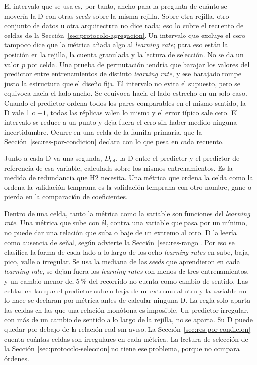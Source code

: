 El intervalo que se usa es, por tanto, ancho para la pregunta de cuánto se movería la D con otras \emph{seeds} sobre la misma rejilla. Sobre otra rejilla, otro conjunto de datos u otra arquitectura no dice nada; eso lo cubre el recuento de celdas de la Sección~\ref{sec:protocolo-agregacion}. Un intervalo que excluye el cero tampoco dice que la métrica añada algo al \emph{learning rate}; para eso están la posición en la rejilla, la cuenta granulada y la lectura de selección. No se da un valor $p$ por celda. Una prueba de permutación tendría que barajar los valores del predictor entre entrenamientos de distinto \emph{learning rate}, y ese barajado rompe justo la estructura que el diseño fija. El intervalo no evita el supuesto, pero se equivoca hacia el lado ancho. Se equivoca hacia el lado estrecho en un solo caso. Cuando el predictor ordena todos los pares comparables en el mismo sentido, la D vale 1 o $-1$, todas las réplicas valen lo mismo y el error típico sale cero. El intervalo se reduce a un punto y deja fuera el cero sin haber medido ninguna incertidumbre. Ocurre en una celda de la familia primaria, que la Sección~\ref{sec:res-por-condicion} declara con lo que pesa en cada recuento.

Junto a cada D va una segunda, $D_{\mathrm{ref}}$, la D entre el predictor y el predictor de referencia de esa variable, calculada sobre los mismos entrenamientos. Es la medida de redundancia que H2 necesita. Una métrica que ordena la celda como la ordena la validación temprana es la validación temprana con otro nombre, gane o pierda en la comparación de coeficientes.

Dentro de una celda, tanto la métrica como la variable son funciones del \emph{learning rate}. Una métrica que sube con él, contra una variable que pasa por un mínimo, no puede dar una relación que suba o baje de un extremo al otro. D la leería como ausencia de señal, según advierte la Sección~\ref{sec:res-rango}. Por eso se clasifica la forma de cada lado a lo largo de los ocho \emph{learning rates} en sube, baja, pico, valle o irregular. Se usa la mediana de las \emph{seeds} que aprendieron en cada \emph{learning rate}, se dejan fuera los \emph{learning rates} con menos de tres entrenamientos, y un cambio menor del 5\,\% del recorrido no cuenta como cambio de sentido. Las celdas en las que el predictor sube o baja de un extremo al otro y la variable no lo hace se declaran por métrica antes de calcular ninguna D. La regla solo aparta las celdas en las que una relación monótona es imposible. Un predictor irregular, con más de un cambio de sentido a lo largo de la rejilla, no se aparta. Su D puede quedar por debajo de la relación real sin aviso. La Sección~\ref{sec:res-por-condicion} cuenta cuántas celdas son irregulares en cada métrica. La lectura de selección de la Sección~\ref{sec:protocolo-seleccion} no tiene ese problema, porque no compara órdenes.

